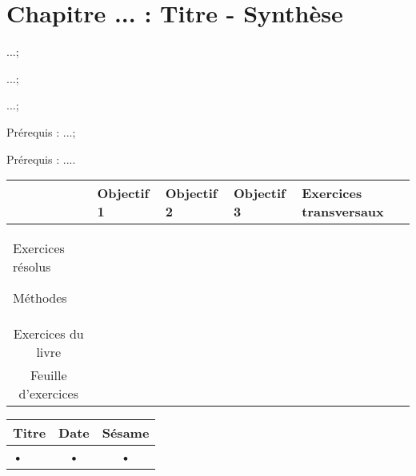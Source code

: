 \documentclass[landscape,french,11pt]{report}
\begin{document}
\fancyhf{}
\ReglePied
\entete{}{}{}



\renewcommand\CouleurChapitre{Kaki}

\chapter{Chapitre ... : Titre - \Large Synthèse}

\thispagestyle{chapitre}
 \bigskip
\begin{multicols}{2}


 \begin{objectifs}
 \item ...;
 \item ...;
 \item ...;

\end{objectifs}

\begin{enligne}
\item Prérequis : ...;
\item Prérequis : ....
\end{enligne}

\end{multicols}

\begin{center}
\begin{tabular}{|m{4cm}|p{4cm}|p{4cm}|p{4cm}|p{4cm}|}
\cline{2-5} 
 \multicolumn{1}{c|}{}&  \multicolumn{1}{M{4cm}|}{Objectif 1} & \multicolumn{1}{M{4cm}|}{Objectif 2} & \multicolumn{1}{M{4cm}|}{Objectif 3} & \multicolumn{1}{M{4cm}|}{Exercices  transversaux} \\ 
\hline 
\multicolumn{1}{|M{4cm}|}{Exercices résolus \par Méthodes}\par    & \vspace*{1.5cm} ~
 &  &  &  \\ 
\hline 
\multicolumn{1}{|c|}{Exercices du livre}  & \vspace*{1.5cm}~ & & & \\ 
\hline 
\multicolumn{1}{|c|}{Feuille d'exercices} &\vspace*{1.5cm}~    & & &  \\ 
\hline


\end{tabular} 

\end{center}

\begin{surEuler}
\begin{center}
\begin{tabular}{|l|c|c|}
\hline 
Titre & Date & Sésame \\ 
\hline 
• & • & • \\ 
\hline 
\end{tabular} 
\end{center}
\end{surEuler}
\end{document}
